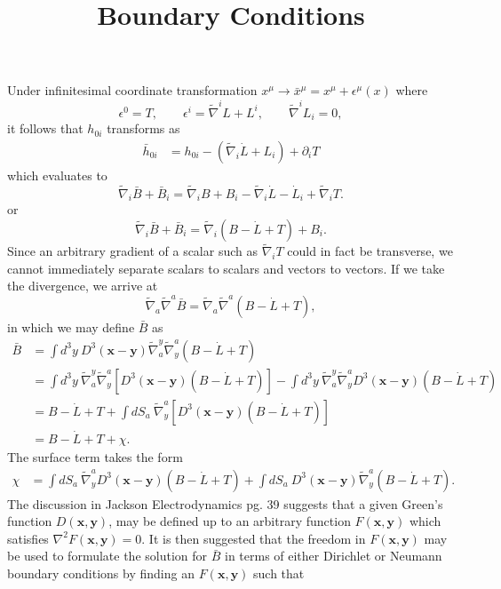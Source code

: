 \documentclass[10pt,letterpaper]{article}
\title{Boundary Conditions}
\date{}
\begin{document}
\maketitle
\noindent 
Under infinitesimal coordinate transformation $x^\mu \to \bar x^\mu = x^\mu + \epsilon^\mu(x)$
where
\[
	\epsilon^0 = T,\qquad \epsilon^i = \tilde\nabla^i L + L^i,\qquad \tilde\nabla^i L_i = 0,
\]
it follows that $h_{0i}$ transforms as 
\begin{align}
 \bar h_{0i} &=  h_{0i} -  (\tilde\nabla_i \dot L + L_i) +  \partial_i T
\end{align}
which evaluates to
\begin{equation}
	\tilde \nabla_i \bar B + \bar B_i = \tilde\nabla_i B + B_i - \tilde\nabla_i \dot L - \dot L_i + \tilde\nabla_i T.
\end{equation}
or
\begin{equation}
\tilde\nabla_i \bar B + \bar B_i = \tilde\nabla_i(B - \dot L + T) + B_i.
\end{equation}
Since an arbitrary gradient of a scalar such as $\tilde\nabla_i T$ could in fact be transverse, we cannot immediately separate scalars to scalars and vectors to vectors. If we take the divergence, we arrive at
\begin{equation}
\tilde\nabla_a \tilde\nabla^a \bar B = \tilde\nabla_a \tilde\nabla^a (B-\dot L + T),
\end{equation}
in which we may define $\bar B$ as
\begin{align}
\bar B&= \int d^3y\ D^3(\mathbf x - \mathbf y)\tilde\nabla_a^y \tilde\nabla^a_y(B-\dot L + T)
\nonumber\\
&= \int d^3y\  \tilde\nabla_a^y \tilde\nabla^a_y\left[ D^3(\mathbf x - \mathbf y)(B-\dot L + T)\right] - \int d^3y \  \tilde\nabla_a^y \tilde\nabla^a_y D^3(\mathbf x - \mathbf y)(B-\dot L + T)
\nonumber\\
&= B-\dot L + T + \int dS_a\  \tilde\nabla^a_y\left[ D^3(\mathbf x - \mathbf y)(B-\dot L + T)\right]
\nonumber\\
&= B - \dot L + T + \chi.
\end{align}
The surface term takes the form
\begin{align}
\chi &=  \int dS_a\   \tilde\nabla^a_yD^3(\mathbf x - \mathbf y)(B-\dot L + T) + \int dS_a\  D^3(\mathbf x - \mathbf y)\tilde\nabla^a_y(B-\dot L + T).
\end{align}
The discussion in Jackson Electrodynamics pg. 39 suggests that a given Green's function $D(\mathbf x, \mathbf y)$, may be defined up to an arbitrary function 
$F(\mathbf x, \mathbf y)$ which satisfies $\nabla^2 F(\mathbf x, \mathbf y) = 0$. It is then suggested that the freedom in $F(\mathbf x, \mathbf y)$ may be used to formulate the solution for $\bar B$ in terms of either Dirichlet or Neumann boundary conditions by finding an $F(\mathbf x, \mathbf y)$ such that
\end{document}
